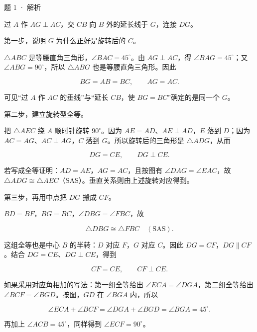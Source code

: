 \begin{solution}{题 1 · 解析}
\diagram{\hhOneRotate}

\solve

过 \(A\) 作 \(AG\perp AC\)，交 \(CB\) 向 \(B\) 外的延长线于 \(G\)，连接 \(DG\)。

第一步，说明 \(G\) 为什么正好是旋转后的 \(C\)。

\(\triangle ABC\) 是等腰直角三角形，\(\angle BAC=45^\circ\)。由 \(AG\perp AC\)，得 \(\angle BAG=45^\circ\)；又 \(\angle ABG=90^\circ\)，所以 \(\triangle ABG\) 也是等腰直角三角形。因此

\[
BG=AB=BC,\qquad AG=AC.
\]

可见“过 \(A\) 作 \(AC\) 的垂线”与“延长 \(CB\)，使 \(BG=BC\)”确定的是同一个 \(G\)。

第二步，建立旋转型全等。

把 \(\triangle AEC\) 绕 \(A\) 顺时针旋转 \(90^\circ\)。因为 \(AE=AD\)、\(AE\perp AD\)，\(E\) 落到 \(D\)；因为 \(AC=AG\)、\(AC\perp AG\)，\(C\) 落到 \(G\)。所以旋转后的三角形是 \(\triangle ADG\)，从而

\[
DG=CE,\qquad DG\perp CE.
\]

若写成全等证明：\(AD=AE\)，\(AG=AC\)，且按图有 \(\angle DAG=\angle EAC\)，故 \(\triangle ADG\cong \triangle AEC\)（\(\mathrm{SAS}\)）。垂直关系则由上述旋转对应得到。

第三步，再用中点把 \(DG\) 搬成 \(CF\)。

\(BD=BF\)，\(BG=BC\)，\(\angle DBG=\angle FBC\)，故

\[
\triangle DBG\cong\triangle FBC\quad(\mathrm{SAS}).
\]

这组全等也是中心 \(B\) 的半转：\(D\) 对应 \(F\)，\(G\) 对应 \(C\)。因此 \(DG=CF\)，\(DG\parallel CF\)。结合 \(DG=CE\)、\(DG\perp CE\)，得到

\[
CF=CE,\qquad CF\perp CE.
\]

如果采用对应角相加的写法：第一组全等给出 \(\angle ECA=\angle DGA\)，第二组全等给出 \(\angle BCF=\angle BGD\)。按图，\(GD\) 在 \(\angle BGA\) 内，所以

\[
\angle ECA+\angle BCF
=\angle DGA+\angle BGD
=\angle BGA=45^\circ.
\]

再加上 \(\angle ACB=45^\circ\)，同样得到 \(\angle ECF=90^\circ\)。


\end{solution}
\clearpage

